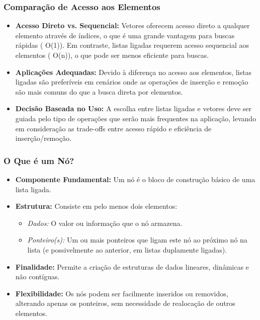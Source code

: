   \begin{frame}[fragile]
  \frametitle{Comparação de Acesso aos Elementos}
  \begin{itemize}
  \item \textbf{Acesso Direto vs. Sequencial:} Vetores oferecem acesso direto a qualquer elemento através de índices, o que é uma grande vantagem para buscas rápidas ( O(1)). Em contraste, listas ligadas requerem acesso sequencial aos elementos ( O(n)), o que pode ser menos eficiente para buscas.
  \item \textbf{Aplicações Adequadas:} Devido à diferença no acesso aos elementos, listas ligadas são preferíveis em cenários onde as operações de inserção e remoção são mais comuns do que a busca direta por elementos.
  \item \textbf{Decisão Baseada no Uso:} A escolha entre listas ligadas e vetores deve ser guiada pelo tipo de operações que serão mais frequentes na aplicação, levando em consideração as trade-offs entre acesso rápido e eficiência de inserção/remoção.
  \end{itemize}
  \end{frame}

\begin{frame}[fragile]
  \frametitle{O Que é um Nó?}
  \begin{itemize}
    \item \textbf{Componente Fundamental:} Um nó é o bloco de construção básico de uma lista ligada.
    \item \textbf{Estrutura:} Consiste em pelo menos dois elementos:
      \begin{itemize}
        \item \textit{Dados:} O valor ou informação que o nó armazena.
        \item \textit{Ponteiro(s):} Um ou mais ponteiros que ligam este nó ao próximo nó na lista (e possivelmente ao anterior, em listas duplamente ligadas).
      \end{itemize}
    \item \textbf{Finalidade:} Permite a criação de estruturas de dados lineares, dinâmicas e não contíguas.
    \item \textbf{Flexibilidade:} Os nós podem ser facilmente inseridos ou removidos, alterando apenas os ponteiros, sem necessidade de realocação de outros elementos.
  \end{itemize}
\end{frame}

